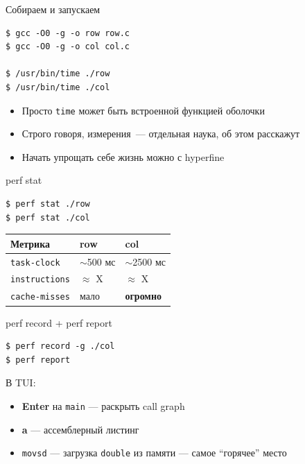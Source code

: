 \documentclass[aspectratio=169, russian]{beamer}
\begin{document}
\begin{frame}[fragile]{Собираем и запускаем}
    \begin{verbatim}
$ gcc -O0 -g -o row row.c
$ gcc -O0 -g -o col col.c

$ /usr/bin/time ./row
$ /usr/bin/time ./col
\end{verbatim}

    \begin{itemize}
        \item Просто \texttt{time} может быть встроенной функцией оболочки
        \item Строго говоря, измерения~--- отдельная наука, об этом расскажут
        \item Начать упрощать себе жизнь можно с hyperfine %
    \end{itemize}

\end{frame}

\begin{frame}[fragile]{perf stat}
    \begin{verbatim}
$ perf stat ./row
$ perf stat ./col
\end{verbatim}

    \bigskip
    \begin{center}
        \begin{tabular}{lll}
            \toprule
            Метрика               & row          & col                      \\
            \midrule
            \texttt{task-clock}   & $\sim$500 мс & $\sim$2500 мс            \\
            \texttt{instructions} & $\approx$ X  & $\approx$ X              \\
            \texttt{cache-misses} & мало         & \alert{\textbf{огромно}} \\
            \bottomrule
        \end{tabular}
    \end{center}

\end{frame}

\begin{frame}[fragile]{perf record + perf report}
    \begin{verbatim}
$ perf record -g ./col
$ perf report
\end{verbatim}

    \bigskip
    В TUI:
    \begin{itemize}
        \item \textbf{Enter} на \texttt{main} --- раскрыть call graph
        \item \textbf{a} --- ассемблерный листинг
        \item \texttt{movsd} --- загрузка \texttt{double} из памяти --- самое \enquote{горячее} место
    \end{itemize}

\end{frame}
\end{document}
